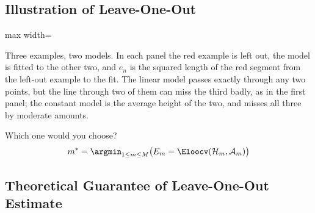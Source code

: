 \subsection{Illustration of Leave-One-Out}

\begin{center}
    \begin{adjustbox}{max width=\textwidth}
    \end{adjustbox}
\end{center}

Three examples, two models. In each panel the red example is left out, the
model is fitted to the other two, and \(e_n\) is the squared length of the red
segment from the left-out example to the fit. The linear model passes exactly
through any two points, but the line through two of them can miss the third
badly, as in the first panel; the constant model is the average height of the
two, and misses all three by moderate amounts.

\begin{question}
    Which one would you choose?
    \[
        m^* = \argmin_{1 \le m \le M} \bigl( E_m =
        \Eloocv(\mathcal{H}_m, \mathcal{A}_m) \bigr)
    \]
\end{question}

\subsection{Theoretical Guarantee of Leave-One-Out Estimate}

